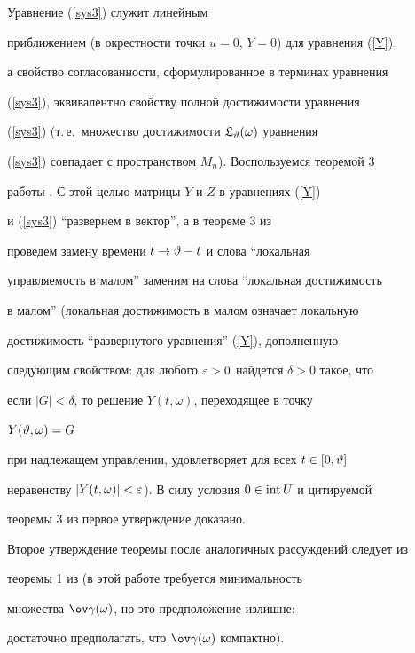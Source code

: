 \begin{pf} Уравнение (\ref{sys3}) служит линейным


приближением (в окрестности точки $u=0$, $Y=0$) для уравнения (\ref{Y}),


а свойство согласованности, сформулированное в терминах уравнения


(\ref{sys3}), эквивалентно свойству полной достижимости уравнения


(\ref{sys3}) (т.\,е.~множество достижимости $\frak L_{\vartheta}(\omega)$ уравнения


(\ref{sys3}) совпадает с пространством $M_n$). Воспользуемся теоремой 3


работы \cite{T74}. С этой целью матрицы $Y$ и $Z$ в уравнениях (\ref{Y})


и (\ref{sys3}) ``развернем в вектор'', а в теореме 3 из


\cite{T74} проведем замену времени $t\to\vartheta-t$ и слова ``локальная


управляемость в малом'' заменим на слова ``локальная достижимость


в малом'' (локальная достижимость в малом означает локальную


достижимость ``развернутого уравнения'' (\ref{Y}), дополненную


следующим свойством: для любого $\varepsilon>0$ найдется $\delta>0$ такое, что


если $|G|<\delta$, то решение $Y(t,\omega)$, переходящее в точку


$Y(\vartheta,\omega)=G$


при надлежащем управлении, удовлетворяет для всех $t\in[0,\vartheta]$


неравенству $|Y(t,\omega)|<\varepsilon$). В силу условия $0\in\operatorname{int} U$ и цитируемой


теоремы 3 из \cite{T74} первое утверждение доказано.





Второе утверждение теоремы после аналогичных рассуждений следует из


теоремы 1 из \cite{T82} (в этой работе требуется минимальность


множества $\ov\gamma(\omega)$, но это предположение излишне:


достаточно предполагать, что $\ov\gamma(\omega)$ компактно).


\end{pf}





